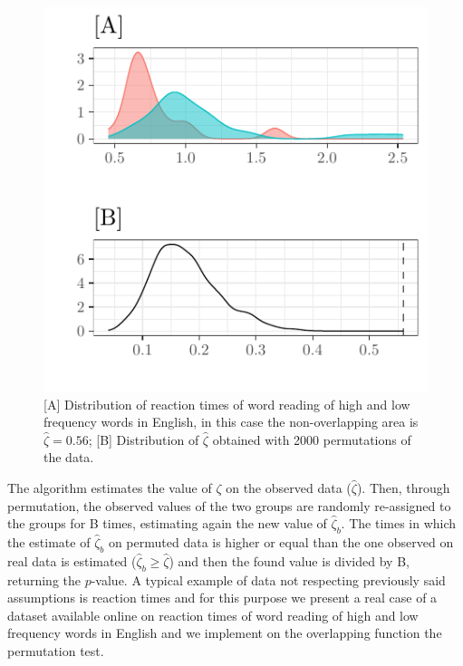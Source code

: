 \documentclass[twocolumn]{article}\usepackage[]{graphicx}\usepackage[]{xcolor}
\makeatletter
\def\maxwidth{ %
  \ifdim\Gin@nat@width>\linewidth
    \linewidth
  \else
    \Gin@nat@width
  \fi
}
\newenvironment{knitrout}{}{} %
\makeatother
\begin{document}
\begin{knitrout}
\color{fgcolor}\begin{figure}[!t]

{\centering \includegraphics[width=\maxwidth]{figure/ex2-1} 

}

\caption{[A] Distribution of reaction times of word reading of high and low frequency words in English, in this case the non-overlapping area is $\hat{\zeta} = 0.56$; [B] Distribution of $\hat{\zeta}$ obtained with 2000 permutations of the data.}\label{fig:ex2}
\end{figure}

\end{knitrout}

The algorithm estimates the value of $\zeta$ on the observed data ($\hat{\zeta}$). Then, through permutation, the observed values of the two groups are randomly re-assigned to the groups for B times, estimating again the new value of  $\hat{\zeta}_b$. The times in which the estimate of $\hat{\zeta}_b$ on permuted data is higher or equal than the one observed on real data is estimated ($\hat{\zeta}_b \geq \hat{\zeta}$) and then the found value is divided by B, returning the $p$-value. 
A typical example of data not respecting previously said assumptions is reaction times and for this purpose we present a real case of a dataset available online \cite{Oksuz_Rebuschat_2024} on reaction times of word reading of high and low frequency words in English and we implement on the overlapping function the permutation test. 
\end{document}
